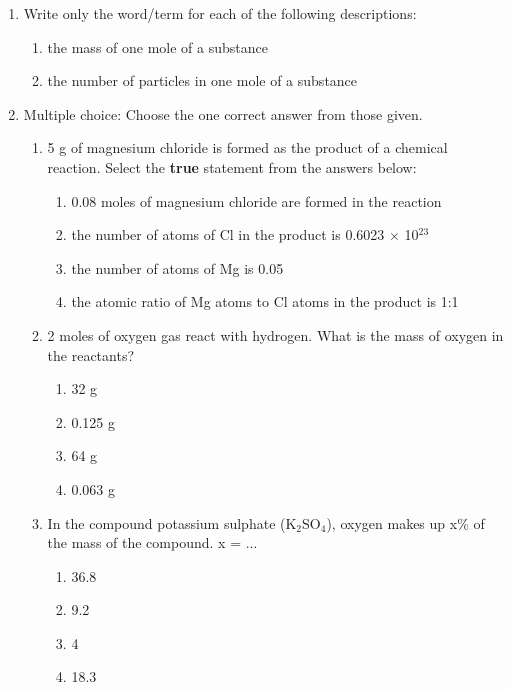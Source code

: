 \begin{eocexercises}{}
\begin{enumerate}
\item{Write only the word/term for each of the following descriptions:}
	\begin{enumerate}
	\item{the mass of one mole of a substance}
	\item{the number of particles in one mole of a substance}
	\end{enumerate}

\item{Multiple choice: Choose the one correct answer from those given.}
\renewcommand{\labelenumii}{\Alph{enumii}}

	\begin{enumerate}
	\item{5 g of magnesium chloride is formed as the product of a chemical reaction. Select the \textbf{true} statement from the answers below:}
		\begin{enumerate}
		\item{0.08 moles of magnesium chloride are formed in the reaction}
		\item{the number of atoms of Cl in the product is 0.6023 $\times$ 10$^{23}$}
		\item{the number of atoms of Mg is 0.05}
		\item{the atomic ratio of Mg atoms to Cl atoms in the product is 1:1}
		\end{enumerate}

	\item{2 moles of oxygen gas react with hydrogen. What is the mass of oxygen in the reactants?}
		\begin{enumerate}
		\item{32 g}
		\item{0.125 g}
		\item{64 g}
		\item{0.063 g}
		\end{enumerate}

	\item{In the compound potassium sulphate (K$_{2}$SO$_{4}$), oxygen makes up x\% of the mass of the compound. x = ...}
		\begin{enumerate}
		\item{36.8}
		\item{9.2}
		\item{4}
		\item{18.3}
		\end{enumerate}


\end{enumerate}
\end{enumerate}
\end{eocexercises}
